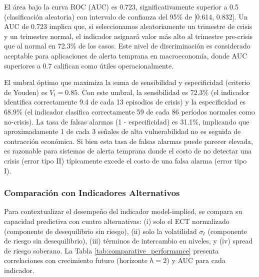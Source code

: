 \documentclass[3p,11pt,draft,natbib=false]{elsarticle}
\begin{document}
El área bajo la curva ROC (AUC) es 0.723, significativamente superior a 0.5 (clasificación aleatoria) con intervalo de confianza del 95\% de [0.614, 0.832]. Un AUC de 0.723 implica que, si seleccionamos aleatoriamente un trimestre de crisis y un trimestre normal, el indicador asignará valor más alto al trimestre pre-crisis que al normal en 72.3\% de los casos. Este nivel de discriminación es considerado aceptable para aplicaciones de alerta temprana en macroeconomía, donde AUC superiores a 0.7 califican como útiles operacionalmente.

El umbral óptimo que maximiza la suma de sensibilidad y especificidad (criterio de Youden) es $V_t = 0.85$. Con este umbral, la sensibilidad es 72.3\% (el indicador identifica correctamente 9.4 de cada 13 episodios de crisis) y la especificidad es 68.9\% (el indicador clasifica correctamente 59 de cada 86 períodos normales como no-crisis). La tasa de falsas alarmas (1 - especificidad) es 31.1\%, implicando que aproximadamente 1 de cada 3 señales de alta vulnerabilidad no es seguida de contracción económica. Si bien esta tasa de falsas alarmas puede parecer elevada, es razonable para sistemas de alerta temprana donde el costo de no detectar una crisis (error tipo II) típicamente excede el costo de una falsa alarma (error tipo I).

\subsubsection{Comparación con Indicadores Alternativos}

Para contextualizar el desempeño del indicador model-implied, se compara su capacidad predictiva con cuatro alternativas: (i) solo el ECT normalizado (componente de desequilibrio sin riesgo), (ii) solo la volatilidad $\sigma_t$ (componente de riesgo sin desequilibrio), (iii) términos de intercambio en niveles, y (iv) spread de riesgo soberano. La Tabla \ref{tab:comparative_performance} presenta correlaciones con crecimiento futuro (horizonte $h=2$) y AUC para cada indicador.
\end{document}
